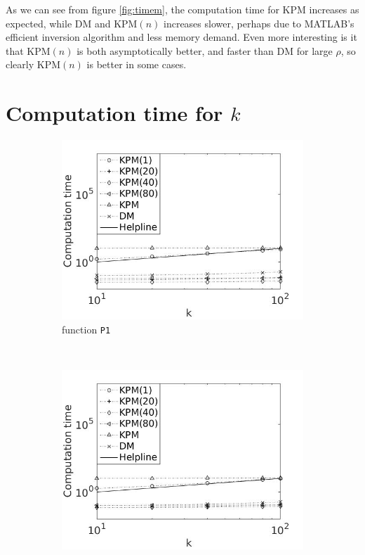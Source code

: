 As we can see from figure \ref{fig:timem}, the computation time for KPM increases as expected, while DM and KPM$(n)$ increases slower, perhaps due to MATLAB's efficient inversion algorithm and less memory demand. 
Even more interesting is it that KPM$(n)$ is both asymptotically better, and faster than DM for large $\rho$, so clearly KPM$(n)$ is better in some cases.
\section{Computation time for $k$} \label{sec:stimek}
\begin{figure}[H]
        \centering
        \begin{subfigure}[b]{0.45\textwidth}
                \includegraphics[width=\textwidth]{fig/n7timevsk1}
                \caption{function \texttt{P1}}
                \label{fig:timek1}
        \end{subfigure}%
~
        \begin{subfigure}[b]{0.45\textwidth}
                \includegraphics[width=\textwidth]{fig/n8timevsk2}

\end{subfigure}
\end{figure}
